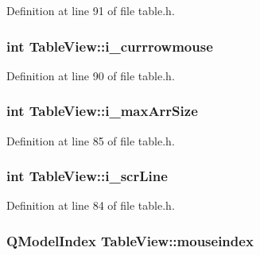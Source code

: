 Definition at line 91 of file table.h.

\hypertarget{classTableView_aed6ae9fb72681922a98a95e41ca84716}{
\subsubsection[{i\_\-currrowmouse}]{\setlength{\rightskip}{0pt plus 5cm}int {\bf TableView::i\_\-currrowmouse}}}
\label{classTableView_aed6ae9fb72681922a98a95e41ca84716}


Definition at line 90 of file table.h.

\hypertarget{classTableView_a02c154332908ba1622903ac621ef31bb}{
\subsubsection[{i\_\-maxArrSize}]{\setlength{\rightskip}{0pt plus 5cm}int {\bf TableView::i\_\-maxArrSize}}}
\label{classTableView_a02c154332908ba1622903ac621ef31bb}


Definition at line 85 of file table.h.

\hypertarget{classTableView_a5fc28c3171c5f26f2f60fac01173a57d}{
\subsubsection[{i\_\-scrLine}]{\setlength{\rightskip}{0pt plus 5cm}int {\bf TableView::i\_\-scrLine}}}
\label{classTableView_a5fc28c3171c5f26f2f60fac01173a57d}


Definition at line 84 of file table.h.

\hypertarget{classTableView_a489364559dd2e697eafec6cce3b67a1c}{
\subsubsection[{mouseindex}]{\setlength{\rightskip}{0pt plus 5cm}QModelIndex {\bf TableView::mouseindex}}}
\label{classTableView_a489364559dd2e697eafec6cce3b67a1c}


